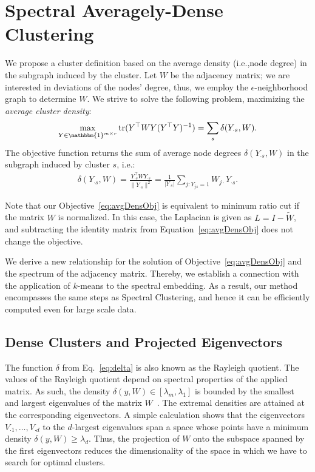 \section{Spectral Averagely-Dense Clustering}
We propose a cluster definition based on the average density (i.e.,\@ node degree) in the subgraph induced by the cluster. Let $W$ be the adjacency matrix; we are interested in deviations of the nodes' degree, thus, we employ the $\epsilon$-neighborhood graph to determine $W$. We strive to solve the following problem, maximizing the \emph{average cluster density}:
\begin{align}\label{eq:avgDensObj}
\max_{Y\in \mathbbm{1}^{m\times r}}\tr(Y^\top WY (Y^\top Y)^{-1})=\sum_s \delta(Y_{\cdot s},W).
\end{align}
The objective function returns the sum of average node degrees $\delta(Y_{\cdot s},W)$ in the subgraph induced by cluster $s$, i.e.:
\begin{align}\label{eq:delta}
\delta(Y_{\cdot s},W) = \frac{Y_{\cdot s}^\top W Y_{\cdot s}}{\|Y_{\cdot s}\|^2} =\frac{1}{|Y_{\cdot s}|}\sum_{j:Y_{js}=1} W_{j\cdot}Y_{\cdot s}.
\end{align}  

Note that our Objective~\eqref{eq:avgDensObj} is equivalent to minimum ratio cut if the matrix $W$ is normalized. In this case, the Laplacian is given as $L=I-\tilde{W}$, and subtracting the identity matrix from Equation~\eqref{eq:avgDensObj} does not change the objective.

We derive a new relationship for the solution of Objective~\eqref{eq:avgDensObj} and the spectrum of the adjacency matrix. Thereby, we establish a connection with the application of $k$-means to the spectral embedding. As a result, our method encompasses the same steps as Spectral Clustering, and hence it can be efficiently computed even for large scale data. 
\subsection{Dense Clusters and Projected Eigenvectors}
The function $\delta$ from Eq.~\eqref{eq:delta} is also known as the Rayleigh quotient. The values of the Rayleigh quotient 
depend on spectral properties of the applied matrix. As such, the density $\delta(y,W)\in [\lambda_m,\lambda_1]$ is bounded by the smallest and largest eigenvalues of the matrix $W$~\citep{collatz1978spektren}. The extremal densities are attained at the corresponding eigenvectors. A simple calculation shows that the eigenvectors $V_{\cdot 1},\ldots,V_{\cdot d}$ to the $d$-largest eigenvalues span a space whose points have a minimum density $\delta(y,W)\geq\lambda_d$. 
Thus, the projection of $W$ onto the subspace spanned by the first eigenvectors reduces the dimensionality of the space in which we have to search for optimal clusters.

